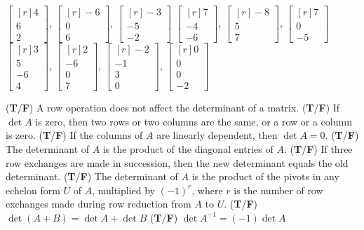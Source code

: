\documentclass[11pt,answers]{exam} %
\newcommand{\mat}[1]{\begin{bmatrix*}[r] #1 \end{bmatrix*}}
\begin{document}
\begin{questions}
    \question $\mat{4 \\ 6 \\ 2}$, $\mat{-6 \\ 0 \\ 6}$, $\mat{-3 \\ -5 \\ -2}$
    \question $\mat{7 \\ -4 \\ -6}$, $\mat{-8 \\ 5 \\ 7}$, $\mat{7 \\ 0 \\ -5}$
    \question $\mat{3 \\ 5 \\ -6 \\ 4}$, $\mat{2 \\ -6 \\ 0 \\ 7}$, $\mat{-2 \\ -1 \\ 3 \\ 0}$, $\mat{0 \\ 0 \\ 0 \\ -2}$

    \question (\textbf{T}/\textbf{F}) A row operation does not affect the determinant of a matrix.
    \question (\textbf{T}/\textbf{F}) If $\det{A}$ is zero, then two rows or two columns are the same, or a row or a column is zero.
    \question (\textbf{T}/\textbf{F}) If the columns of $A$ are linearly dependent, then $\det{A} = 0$.
    \question (\textbf{T}/\textbf{F}) The determinant of $A$ is the product of the diagonal entries of $A$.
    \question (\textbf{T}/\textbf{F}) If three row exchanges are made in succession, then the new determinant equals the old determinant.
    \question (\textbf{T}/\textbf{F}) The determinant of $A$ is the product of the pivots in any echelon form $U$ of $A$, multiplied by $(-1)^r$, where $r$ is the number of row exchanges made during row reduction from $A$ to $U$.
    \question (\textbf{T}/\textbf{F}) $\det{(A+B)} = \det{A} + \det{B}$
    \question (\textbf{T}/\textbf{F}) $\det{A^{-1}} = (-1)\det{A}$


\end{questions}
\end{document}
